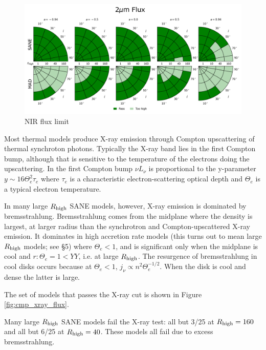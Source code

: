 \begin{figure}
  \centering
  \includegraphics[width=\columnwidth]{./figures/2um_flux_Constraints.png}
  \caption{NIR flux limit}
  \label{fig:cmp_2um_flux}
\end{figure}



Most thermal models produce X-ray emission through Compton upscattering of thermal synchroton photons.  Typically the X-ray band lies in the first Compton bump, although that is sensitive to the temperature of the electrons doing the upscattering.  In the first Compton bump $\nu L_\nu$ is proportional to the y-parameter $y \sim 16 \Theta_e^2 \tau_e$ where $\tau_e$ is a characteristic electron-scattering optical depth and $\Theta_e$ is a typical electron temperature.

In many large $R_\mathrm{high}$ SANE models, however, X-ray emission is dominated by bremsstrahlung.  Bremsstrahlung comes from the midplane where the density is largest, at larger radius than the synchrotron and Compton-upscattered X-ray emission.  It dominates in high accretion rate models (this turns out to mean large $R_\mathrm{high}$ models; see \S 5) where $\Theta_e < 1$, and is significant only when the midplane is cool and $r: \Theta_e = 1 < YY$, i.e. at large $R_\mathrm{high}$.  The resurgence of bremsstrahlung in cool disks occurs because at $\Theta_e < 1$, $j_\nu \propto n^2 \Theta_e^{-1/2}$.  When the disk is cool and dense the latter is large.

The set of models that passes the X-ray cut is shown in Figure \ref{fig:cmp_xray_flux}.

Many large $R_\mathrm{high}$ SANE models fail the X-ray test: all but 3/25 at $R_\mathrm{high} = 160$ and all but 6/25 at $R_\mathrm{high} = 40$.  These models all fail due to excess bremsstrahlung.


